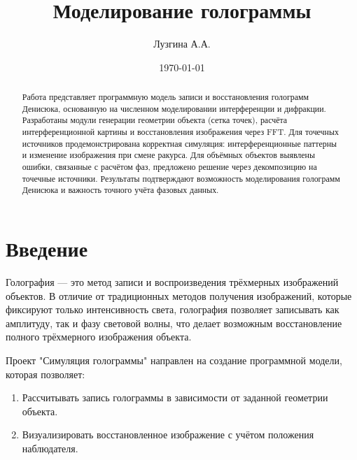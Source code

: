 \documentclass[aps,twocolumn,secnumarabic,balancelastpage,amsmath,amssymb,nofootinbib, floatfix]{revtex4-1}
\begin{document}
	\title{Моделирование голограммы\\}
	\author{Лузгина А.А.}
	\date{\today}
	
	
	\begin{abstract}
		Работа представляет программную модель записи и восстановления голограмм Денисюка, основанную на численном моделировании интерференции и дифракции. Разработаны модули генерации геометрии объекта (сетка точек), расчёта интерференционной картины и восстановления изображения через FFT. Для точечных источников продемонстрирована корректная симуляция: интерференционные паттерны и изменение изображения при смене ракурса. Для объёмных объектов выявлены ошибки, связанные с расчётом фаз, предложено решение через декомпозицию на точечные источники. Результаты подтверждают возможность моделирования голограмм Денисюка и важность точного учёта фазовых данных. 
	\end{abstract}
	
	\maketitle
	
	
	
	



		\section{Введение}  

Голография — это метод записи и воспроизведения трёхмерных изображений объектов. В отличие от традиционных методов получения изображений, которые фиксируют только интенсивность света, голография позволяет записывать как амплитуду, так и фазу световой волны, что делает возможным восстановление полного трёхмерного изображения объекта.  

Проект "Симуляция голограммы" направлен на создание программной модели, которая позволяет:  \begin{enumerate}
\item Рассчитывать запись голограммы в зависимости от заданной геометрии объекта.  
\item Визуализировать восстановленное изображение с учётом положения наблюдателя.  
\end{enumerate}
\end{document}
